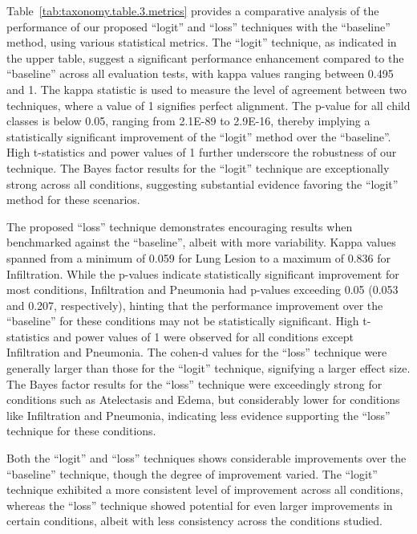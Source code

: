 \documentclass[authoryear,preprint,review,12pt]{elsarticle}
\begin{document}
Table~\ref{tab:taxonomy.table.3.metrics} provides a comparative analysis of the performance of our proposed ``logit'' and ``loss'' techniques with the ``baseline'' method, using various statistical metrics. The ``logit'' technique, as indicated in the upper table, suggest a significant performance enhancement compared to the ``baseline'' across all evaluation tests, with kappa values ranging between 0.495 and 1. The kappa statistic is used to measure the level of agreement between two techniques, where a value of 1 signifies perfect alignment. The p-value for all child classes is below 0.05, ranging from 2.1E-89 to 2.9E-16, thereby implying a statistically significant improvement of the ``logit'' method over the ``baseline''. High t-statistics and power values of 1 further underscore the robustness of our technique. The Bayes factor results for the ``logit'' technique are exceptionally strong across all conditions, suggesting substantial evidence favoring the ``logit'' method for these scenarios.

The proposed ``loss'' technique demonstrates encouraging results when benchmarked against the ``baseline'', albeit with more variability. Kappa values spanned from a minimum of 0.059 for Lung Lesion to a maximum of 0.836 for Infiltration. While the p-values indicate statistically significant improvement for most conditions, Infiltration and Pneumonia had p-values exceeding 0.05 (0.053 and 0.207, respectively), hinting that the performance improvement over the ``baseline'' for these conditions may not be statistically significant. High t-statistics and power values of 1 were observed for all conditions except Infiltration and Pneumonia. The cohen-d values for the ``loss'' technique were generally larger than those for the ``logit'' technique, signifying a larger effect size. The Bayes factor results for the ``loss'' technique were exceedingly strong for conditions such as Atelectasis and Edema, but considerably lower for conditions like Infiltration and Pneumonia, indicating less evidence supporting the ``loss'' technique for these conditions.

Both the ``logit'' and ``loss'' techniques shows considerable improvements over the ``baseline'' technique, though the degree of improvement varied. The ``logit'' technique exhibited a more consistent level of improvement across all conditions, whereas the ``loss'' technique showed potential for even larger improvements in certain conditions, albeit with less consistency across the conditions studied.
\end{document}
